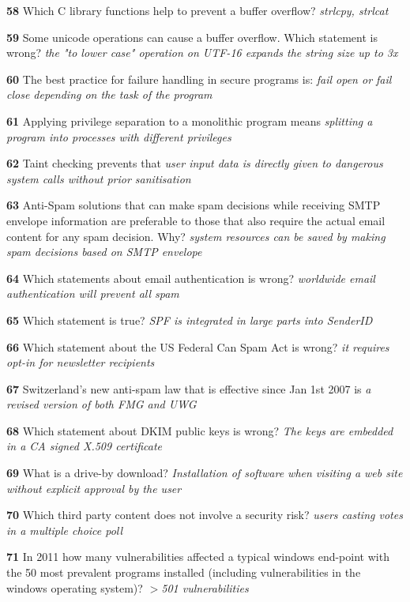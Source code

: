 \textbf{  58}  Which C library functions help to prevent a buffer overflow?  
\textit{ strlcpy, strlcat}

\textbf{  59}  Some unicode operations can cause a buffer overflow. Which statement is wrong?  
\textit{ the "to lower case" operation on UTF-16 expands the string size up to 3x}

\textbf{  60}  The best practice for failure handling in secure programs is:  
\textit{ fail open or fail close depending on the task of the program}

\textbf{  61}  Applying privilege separation to a monolithic program means  
\textit{ splitting a program into processes with different privileges}

\textbf{  62}  Taint checking prevents that  
\textit{ user input data is directly given to dangerous system calls without prior sanitisation}

\textbf{  63}  Anti-Spam solutions that can make spam decisions while receiving SMTP envelope information are preferable to those that also require the actual email content for any spam decision. Why? 
\textit{ system resources can be saved by making spam decisions based on SMTP envelope}

\textbf{  64}  Which statements about email authentication is wrong?  
\textit{ worldwide email authentication will prevent all spam}

\textbf{  65}  Which statement is true?  
\textit{ SPF is integrated in large parts into SenderID}

\textbf{  66}  Which statement about the US Federal Can Spam Act is wrong?  
\textit{ it requires opt-in for newsletter recipients}

\textbf{  67}  Switzerland’s new anti-spam law that is effective since Jan 1st 2007 is  
\textit{ a revised version of both FMG and UWG}

\textbf{  68}  Which statement about DKIM public keys is wrong?  
\textit{ The keys are embedded in a CA signed X.509 certificate}

\textbf{  69}  What is a drive-by download?  
\textit{ Installation of software when visiting a web site without explicit approval by the user}

\textbf{  70}  Which third party content does not involve a security risk?  
\textit{ users casting votes in a multiple choice poll}

\textbf{  71}  In 2011 how many vulnerabilities affected a typical windows end-point with the 50 most prevalent programs installed (including vulnerabilities in the windows operating system)? 
\textit{ $>$501 vulnerabilities}

